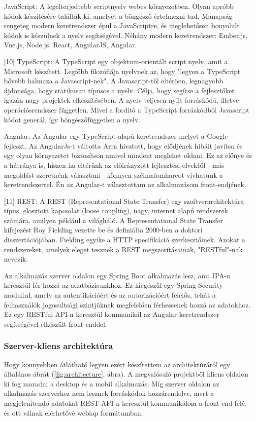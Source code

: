JavaScript: A legelterjedtebb scriptnyelv webes környezetben. Olyan apróbb kódok készítésére találták ki, amelyet a böngésző értelmezni tud. Manapság rengeteg modern keretrendszer épül a JavaScriptre, és meglehetősen bonyolult kódok is készülnek a nyelv segítségével. Néhány modern keretrendszer: Ember.js, Vue.js, Node.js, React, AngularJS, Angular.

[10] TypeScript: A TypeScript egy objektum-orientált script nyelv, amit a Microsoft készített. Legfőbb filozófiája nyelvnek az, hogy "legyen a TypeScript bővebb halmaza a Javascript-nek". A Javascript-től eltérően, legnagyobb újdonsága, hogy statikusan típusos a nyelv. Célja, hogy segítse a fejlesztőket igazán nagy projektek elkészítésében. A nyelv teljesen nyílt forráskódú, illetve operációsrendszer független. Mivel a fordító a TypeScript forráskódból Javascript kódot generál, így böngészőfüggetlen a nyelv.

Angular: Az Angular egy TypeScript alapú keretrendszer melyet a Google fejleszt. Az AngularJs-t váltotta Arra hivatott, hogy elődjének hibáit javítsa és egy olyan környezetet biztosítson amivel mindent meglehet oldani. Ez az előnye és a hátránya is, hiszen ha eltérünk az előirányzott fejlesztési elvektől - más megoldást szeretnénk választani - könnyen szélmalomharcot vívhatunk a keretrendszerrel. Én az Angular-t választottam az alkalmazásom front-endjének.

[11] REST: A REST (Representational State Transfer) egy szoftverarchitektúra típus, elosztott kapcsolat (loose coupling), nagy, internet alapú rendszerek számára, amilyen például a világháló. A Representational State Transfer kifejezést Roy Fielding vezette be és definiálta 2000-ben a doktori disszertációjában. Fielding egyike a HTTP specifikáció szerkesztőinek.
Azokat a rendszereket, amelyek eleget tesznek a REST megszorításainak, "RESTful"-nak nevezik.

Az alkalmazás szerver oldalon egy Spring Boot alkalmazás lesz, ami JPA-n keresztül fér hozzá az adatbázisunkhoz. Ez kiegészül egy Spring Security modullal, amely az autentikációért és az autorizációért felelős, tehát  a felhasználók jogosultsági szintjüknek megfelelően férhessenek hozzá az adatokhoz. Ez egy RESTful API-n keresztül kommunikál az Angular keretrendszer segítségével elkészült front-enddel. 

\subsubsection{Szerver-kliens architektúra}
Hogy könnyebben átlátható legyen ezért készítettem az architektúráról egy általános ábrát (\ref{fig:architecture}. ábra). 
A megvalósuló projektből kliens oldalon ki fog maradni a desktop és a mobil alkalmazás. Míg szerver oldalon az alkalmazás szerverhez nem lesznek forráskódok hozzárendelve, mert a megjelenítendő adatokat REST API-n keresztül kommunikálom a front-end felé, és ott válnak elérhetővé weblap formátumban.

